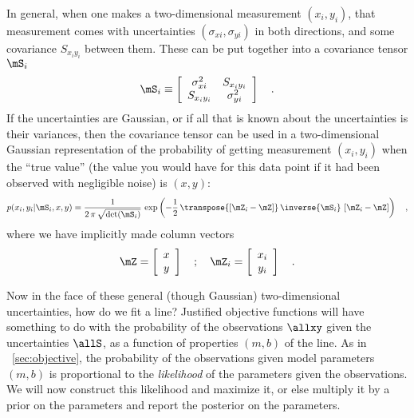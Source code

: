 \documentclass[12pt,twoside,pdftex]{article}
\begin{document}
In general, when one makes a two-dimensional measurement $(x_i,y_i)$,
that measurement comes with uncertainties $(\sigma_{xi},\sigma_{yi})$
in both directions, and some covariance $S_{x_iy_i}$ between them.
These can be put together into a covariance tensor $\mS_i$
\begin{equation}
\mS_i \equiv \left[\begin{array}{cc}
\sigma_{xi}^2 & S_{x_iy_i} \\ S_{x_iy_i} & \sigma_{yi}^2
\end{array}\right] \quad .
\end{equation}
If the uncertainties are Gaussian, or if all that is known about the
uncertainties is their variances, then the covariance tensor can be
used in a two-dimensional Gaussian representation of the probability
of getting measurement $(x_i,y_i)$ when the ``true value'' (the value
you would have for this data point if it had been observed with
negligible noise) is $(x,y)$:
\begin{equation}
p(x_i,y_i|\mS_i,x,y) = \frac{1}{2\,\pi\,\sqrt{\det(\mS_i)}}
  \,\exp\left(-\frac{1}{2}\,\transpose{\left[\mZ_i - \mZ\right]}
  \,\inverse{\mS_i}\,\left[\mZ_i - \mZ\right]\right) \quad ,
\end{equation}
where we have implicitly made column vectors
\begin{equation}\label{eq:mZ}
\mZ = \left[\begin{array}{c} x \\ y \end{array}\right] \quad ; \quad
\mZ_i = \left[\begin{array}{c} x_i \\ y_i \end{array}\right] \quad .
\end{equation}

Now in the face of these general (though Gaussian) two-dimensional
uncertainties, how do we fit a line?  Justified objective functions
will have something to do with the probability of the observations
$\allxy$ given the uncertainties $\allS$, as a function of properties
$(m,b)$ of the line.  As in \sectionname~\ref{sec:objective}, the
probability of the observations given model parameters $(m,b)$ is
proportional to the \emph{likelihood} of the parameters given the
observations.  We will now construct this likelihood and maximize it,
or else multiply it by a prior on the parameters and report the
posterior on the parameters.
\end{document}
